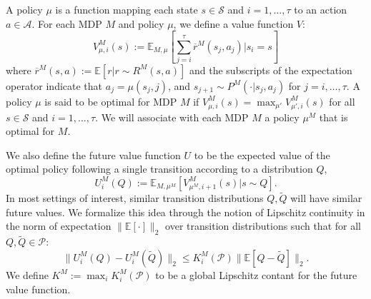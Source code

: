 \documentclass{article}
\newcommand{\Exp}{\mathds{E}}
\newcommand{\Pc}{\mathcal{P}}
\newcommand{\Sc}{\mathcal{S}}
\newcommand{\Ac}{\mathcal{A}}
\begin{document}
A policy $\mu$ is a function mapping each state $s \in \Sc$ and $i = 1,\ldots,\tau$ to an action $a \in \Ac$.
For each MDP $M$ and policy $\mu$, we define a value function $V$:
\begin{equation}
\label{eq: value fn}
V^{M}_{\mu, i}(s) := \Exp_{M,\mu}\left[ \sum_{j=i}^{\tau} \overline{r}^M(s_j,a_j) \Big| s_i = s \right]
\end{equation}
where $\overline{r}^M(s,a) := \Exp[r | r \sim R^M(s,a)]$ and the subscripts of the expectation operator indicate that $a_j = \mu(s_j, j)$, and $s_{j+1} \sim P^M(\cdot| s_j, a_j)$ for $j = i, \ldots, \tau$.  A policy $\mu$ is said to be optimal for MDP $M$ if $V^{M}_{\mu, i}(s) = \max_{\mu'} V^{M}_{\mu', i}(s)$ for all $s \in \Sc$ and $i=1,\ldots,\tau$. We will associate with each MDP $M$ a policy $\mu^M$ that is optimal for $M$.

We also define the future value function $U$ to be the expected value of the optimal policy following a single transition according to a distribution $Q$,
\begin{equation}
\label{eq: future value}
U^M_{i}(Q) := \Exp_{M,\mu^M}\left[ V^M_{\mu^M,i+1}(s) \big| s \sim Q \right].
\end{equation}
In most settings of interest, similar transition distributions $Q,\tilde{Q}$ will have similar future values.
We formalize this idea through the notion of Lipschitz continuity in the norm of expectation $\| \Exp[\cdot] \|_2$ over transition distributions such that for all $Q,\tilde{Q} \in \Pc$:
\begin{equation}
\label{eq: future Lipschitz}
\| U^M_i(Q) - U^M_i(\tilde{Q}) \|_2 \le K^M_i(\Pc) \| \Exp[ Q - \tilde{Q}] \|_2.
\end{equation}
We define $K^M := \max_{i} K^M_i(\Pc)$ to be a global Lipschitz contant for the future value function.
\end{document}
